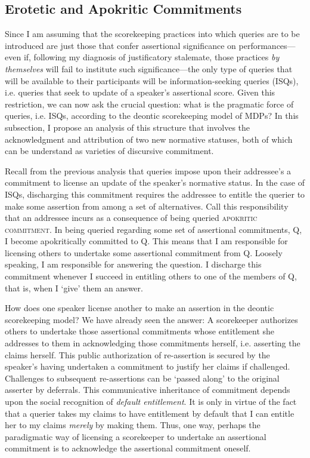 \documentclass{article}                     %
\begin{document}
\subsection{Erotetic and Apokritic Commitments}

Since I am assuming that the scorekeeping practices into which queries
are to be introduced are just those that confer assertional significance
on performances---even if, following my diagnosis of justificatory
stalemate, those practices \emph{by themselves} will fail to institute
such significance---the only type of queries that will be available
to their participants will be information-seeking queries (ISQs),
i.e. queries that seek to update of a speaker's assertional score.
Given this restriction, we can now ask the crucial question: what
is the pragmatic force of queries, i.e. ISQs, according to
the deontic scorekeeping model of MDPs? In this subsection, I propose
an analysis of this structure that involves the acknowledgment and
attribution of two new normative statuses, both of which can be understand
as varieties of discursive commitment.

Recall from the previous analysis that queries impose upon their addressee's
a commitment to license an update of the speaker's normative status.
In the case of ISQs, discharging this commitment requires the addressee
to entitle the querier to make some assertion from among a set of
alternatives. Call this responsibility that an addressee incurs as
a consequence of being queried \textsc{apokritic commitment}. In being
queried regarding some set of assertional commitments, Q, I become
apokritically committed to Q. This means that I am responsible for
licensing others to undertake some assertional commitment from Q.
Loosely speaking, I am responsible for answering the question. I discharge
this commitment whenever I succeed in entitling others to one of the
members of Q, that is, when I `give' them an answer.

How does one speaker license another to make an assertion in the deontic
scorekeeping model? We have already seen the answer: A scorekeeper
authorizes others to undertake those assertional commitments whose
entitlement she addresses to them in acknowledging those commitments
herself, i.e. asserting the claims herself. This public authorization
of re-assertion is secured by the speaker's having undertaken a commitment
to justify her claims if challenged. Challenges to subsequent re-assertions
can be `passed along' to the original asserter by deferrals. This
communicative inheritance of commitment depends upon the social recognition
of \emph{default entitlement}. It is only in virtue of the fact that
a querier takes my claims to have entitlement by default that I can
entitle her to my claims \emph{merely} by making them. Thus, one way,
perhaps the paradigmatic way of licensing a scorekeeper to undertake
an assertional commitment is to acknowledge the assertional commitment
oneself. 
\end{document}
